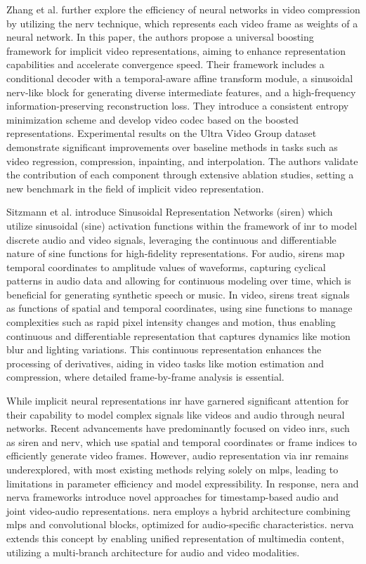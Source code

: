 Zhang et al. \cite{zhang2024boosting} further explore the efficiency of neural networks in video compression by utilizing the \gls{nerv} technique, which represents each video frame as weights of a neural network. In this paper, the authors propose a universal boosting framework for implicit video representations, aiming to enhance representation capabilities and accelerate convergence speed. Their framework includes a conditional decoder with a temporal-aware affine transform module, a sinusoidal \gls{nerv}-like block for generating diverse intermediate features, and a high-frequency information-preserving reconstruction loss. They introduce a consistent entropy minimization scheme and develop video \gls{codec} based on the boosted representations. Experimental results on the Ultra Video Group dataset demonstrate significant improvements over baseline methods in tasks such as video regression, compression, inpainting, and interpolation. The authors validate the contribution of each component through extensive ablation studies, setting a new benchmark in the field of implicit video representation.

Sitzmann et al. \cite{sitzmann2020implicit} introduce Sinusoidal Representation Networks (\gls{siren}) which utilize sinusoidal (sine) activation functions within the framework of \gls{inr} to model discrete audio and video signals, leveraging the continuous and differentiable nature of sine functions for high-fidelity representations. For audio, \gls{siren}s map temporal coordinates to amplitude values of waveforms, capturing cyclical patterns in audio data and allowing for continuous modeling over time, which is beneficial for generating synthetic speech or music. In video, \gls{siren}s treat signals as functions of spatial and temporal coordinates, using sine functions to manage complexities such as rapid pixel intensity changes and motion, thus enabling continuous and differentiable representation that captures dynamics like motion blur and lighting variations. This continuous representation enhances the processing of derivatives, aiding in video tasks like motion estimation and compression, where detailed frame-by-frame analysis is essential.

While implicit neural representations \gls{inr} have garnered significant attention for their capability to model complex signals like videos and audio through neural networks. Recent advancements have predominantly focused on video \gls{inr}s, such as \gls{siren} and \gls{nerv}, which use spatial and temporal coordinates or frame indices to efficiently generate video frames. However, audio representation via \gls{inr} remains underexplored, with most existing methods relying solely on \gls{mlp}s, leading to limitations in parameter efficiency and model expressibility. In response, \gls{nera} and \gls{nerva} frameworks \cite{NeRVA-2024} introduce novel approaches for timestamp-based audio and joint video-audio representations. \gls{nera} employs a hybrid architecture combining \gls{mlp}s and convolutional blocks, optimized for audio-specific characteristics. \gls{nerva} extends this concept by enabling unified representation of multimedia content, utilizing a multi-branch architecture for audio and video modalities.

